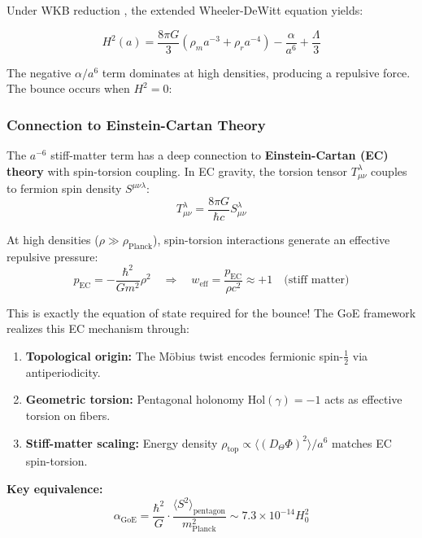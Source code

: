 \documentclass[12pt]{article}
\theoremstyle{definition}
\theoremstyle{plain}
\begin{document}
Under WKB reduction \cite{barroso2024,demetrio2023,pinto2020}, the extended Wheeler-DeWitt equation yields:

\begin{equation}
H^2(a) = \frac{8\pi G}{3}\left(\rho_m a^{-3} + \rho_r a^{-4}\right) - \frac{\alpha}{a^6} + \frac{\Lambda}{3}
\end{equation}

The negative $\alpha/a^6$ term dominates at high densities, producing a repulsive force. The bounce occurs when $H^2 = 0$:

\subsubsection{Connection to Einstein-Cartan Theory}

The $a^{-6}$ stiff-matter term has a deep connection to \textbf{Einstein-Cartan (EC) theory} with spin-torsion coupling. In EC gravity, the torsion tensor $T^\lambda_{\mu\nu}$ couples to fermion spin density $S^{\mu\nu\lambda}$:
\begin{equation}
T^\lambda_{\mu\nu} = \frac{8\pi G}{\hbar c} S^{\lambda}_{\mu\nu}
\end{equation}

At high densities ($\rho \gg \rho_{\text{Planck}}$), spin-torsion interactions generate an effective repulsive pressure:
\begin{equation}
p_{\text{EC}} = -\frac{\hbar^2}{G m^2} \rho^2 \quad \Rightarrow \quad w_{\text{eff}} = \frac{p_{\text{EC}}}{\rho c^2} \approx +1 \quad \text{(stiff matter)}
\end{equation}

This is exactly the equation of state required for the bounce! The GoE framework realizes this EC mechanism through:
\begin{enumerate}
\item \textbf{Topological origin:} The M\"obius twist encodes fermionic spin-$\tfrac{1}{2}$ via antiperiodicity.
\item \textbf{Geometric torsion:} Pentagonal holonomy $\text{Hol}(\gamma) = -1$ acts as effective torsion on fibers.
\item \textbf{Stiff-matter scaling:} Energy density $\rho_{\text{top}} \propto \langle (D_\Theta \Phi)^2 \rangle / a^6$ matches EC spin-torsion.
\end{enumerate}

\textbf{Key equivalence:}
\begin{equation}
\boxed{\alpha_{\text{GoE}} = \frac{\hbar^2}{G} \cdot \frac{\langle S^2 \rangle_{\text{pentagon}}}{m_{\text{Planck}}^2} \sim 7.3 \times 10^{-14} H_0^2}
\end{equation}
\end{document}
